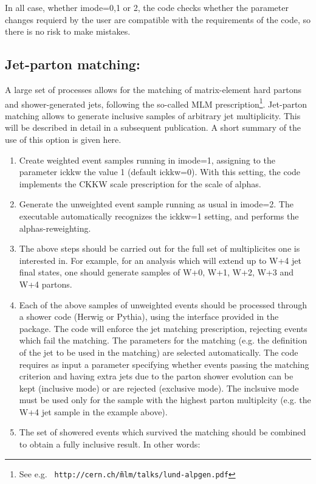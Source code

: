 \documentclass[paper]{JHEP3}
\begin{document}
\begin{appendix}
In all case, whether imode=0,1 or 2, the code checks whether the
parameter changes requierd by the user are compatible with the
requirements of the code, so there is no risk to make mistakes.


\subsection{Jet-parton matching:} 
A large set of processes allows for the matching of matrix-element
hard partons and shower-generated jets, following the so-called MLM
prescription\footnote{See e.g. {\tt
    http://cern.ch/\~mlm/talks/lund-alpgen.pdf}}.  
Jet-parton matching allows to generate inclusive samples
of arbitrary jet multiplicity. This will be described in detail in a
subsequent publication. A short summary of the use of this option is
given here.
\begin{enumerate}
\item 
  Create weighted event samples running in imode=1, assigning to the
  parameter ickkw the value 1 (default ickkw=0). With this setting,
  the code implements the CKKW scale prescription for the scale of
  alphas. 
\item 
  Generate the unweighted event sample running as usual in
  imode=2. The executable automatically recognizes the ickkw=1
  setting, and performs the alphas-reweighting.
\item 
  The above steps should be carried out for the full set of
  multiplicites one is interested in. For example, for an analysis
  which will extend up to W+4 jet final states, one should generate
  samples of W+0, W+1, W+2, W+3 and W+4 partons.
\item 
  Each of the above samples of unweighted events should be processed
  through a shower code (Herwig or Pythia), using the interface
  provided in the package. The code will enforce the jet matching
  prescription, rejecting events which fail the matching. The
  parameters for the matching (e.g. the definition of the jet to be
  used in the matching) are selected automatically. The code requires
  as input a parameter specifying whether events passing the matching
  criterion and having extra jets due to the parton shower evolution
  can be kept (inclusive mode) or are rejected (exclusive mode). The
  inclsuive mode must be used only for the sample with the highest
  parton multiplcity (e.g. the W+4 jet sample in the example above).
\item 
  The set of showered events which survived the matching should be
  combined to obtain a fully inclusive result. In other words:

\end{enumerate}
\end{appendix}
\end{document}
